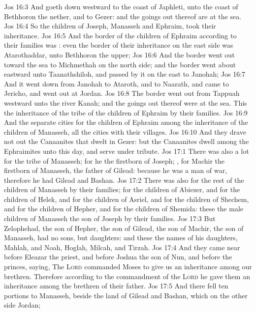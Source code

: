\vs Jos 16:3 And goeth down westward to the coast of Japhleti, unto the coast of Bethhoron the nether, and to Gezer: and the goings out thereof are at the sea.
\vs Jos 16:4 So the children of Joseph, Manasseh and Ephraim, took their inheritance.
\vs Jos 16:5 And the border of the children of Ephraim according to their families was : even the border of their inheritance on the east side was Atarothaddar, unto Bethhoron the upper;
\vs Jos 16:6 And the border went out toward the sea to Michmethah on the north side; and the border went about eastward unto Taanathshiloh, and passed by it on the east to Janohah;
\vs Jos 16:7 And it went down from Janohah to Ataroth, and to Naarath, and came to Jericho, and went out at Jordan.
\vs Jos 16:8 The border went out from Tappuah westward unto the river Kanah; and the goings out thereof were at the sea. This  the inheritance of the tribe of the children of Ephraim by their families.
\vs Jos 16:9 And the separate cities for the children of Ephraim  among the inheritance of the children of Manasseh, all the cities with their villages.
\vs Jos 16:10 And they drave not out the Canaanites that dwelt in Gezer: but the Canaanites dwell among the Ephraimites unto this day, and serve under tribute.
\vs Jos 17:1 There was also a lot for the tribe of Manasseh; for he  the firstborn of Joseph; , for Machir the firstborn of Manasseh, the father of Gilead: because he was a man of war, therefore he had Gilead and Bashan.
\vs Jos 17:2 There was also  for the rest of the children of Manasseh by their families; for the children of Abiezer, and for the children of Helek, and for the children of Asriel, and for the children of Shechem, and for the children of Hepher, and for the children of Shemida: these  the male children of Manasseh the son of Joseph by their families.
\vs Jos 17:3 But Zelophehad, the son of Hepher, the son of Gilead, the son of Machir, the son of Manasseh, had no sons, but daughters: and these  the names of his daughters, Mahlah, and Noah, Hoglah, Milcah, and Tirzah.
\vs Jos 17:4 And they came near before Eleazar the priest, and before Joshua the son of Nun, and before the princes, saying, The \textsc{Lord} commanded Moses to give us an inheritance among our brethren. Therefore according to the commandment of the \textsc{Lord} he gave them an inheritance among the brethren of their father.
\vs Jos 17:5 And there fell ten portions to Manasseh, beside the land of Gilead and Bashan, which  on the other side Jordan;
